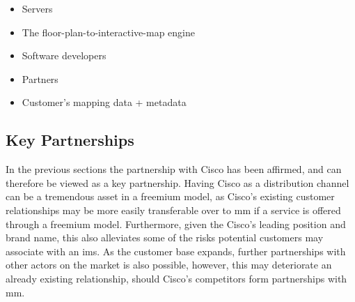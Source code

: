 \begin{itemize}
    \item Servers
    \item The floor-plan-to-interactive-map engine
    \item Software developers
    \item Partners
    \item Customer's mapping data + metadata
\end{itemize}

\begin{table}[]
\centering
\caption{Key resources by category}
\label{keyresources}
\end{table}


\subsection{Key Partnerships}
In the previous sections the partnership with Cisco has been affirmed, and can therefore be viewed as a key partnership. Having Cisco as a distribution channel can be a tremendous asset in a freemium model, as Cisco's existing customer relationships may be more easily transferable over to \gls{mm} if a service is offered through a freemium model. Furthermore, given the Cisco's leading position and brand name, this also alleviates some of the risks potential customers may associate with an \gls{ims}.  As the customer base expands, further partnerships with other actors on the market is also possible, however, this may deteriorate an already existing relationship, should Cisco's competitors form partnerships with \gls{mm}. 


